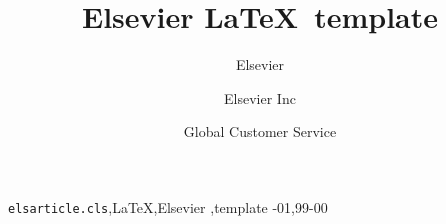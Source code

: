\documentclass[review]{elsarticle}
\begin{document}
\begin{frontmatter}

\title{Elsevier \LaTeX\ template}

\author{Elsevier}
\address{Radarweg 29, Amsterdam}

\author[mymainaddress,mysecondaryaddress]{Elsevier Inc}

\author[mysecondaryaddress]{Global Customer Service}

\address[mymainaddress]{1600 John F Kennedy Boulevard, Philadelphia}
\address[mysecondaryaddress]{360 Park Avenue South, New York}

\begin{abstract}
\end{abstract}

\begin{keyword}
\texttt{elsarticle.cls}\sep \LaTeX\sep Elsevier \sep template
-01\sep  99-00
\end{keyword}

\end{frontmatter}

\linenumbers
\end{document}
